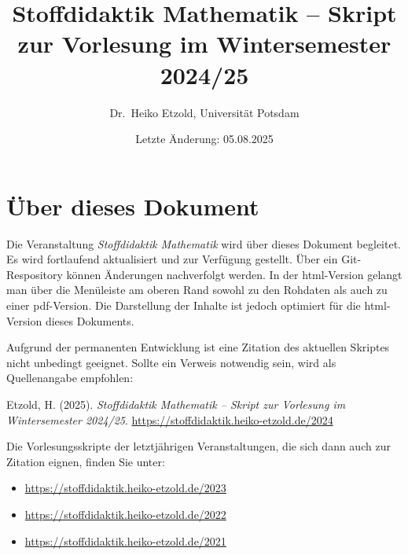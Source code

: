 \documentclass[
]{scrbook}
\title{Stoffdidaktik Mathematik -- Skript zur Vorlesung im Wintersemester 2024/25}
\author{Dr.~Heiko Etzold, Universität Potsdam}
\date{Letzte Änderung: 05.08.2025}
\makeatletter
\providecommand{\tightlist}{%
  \setlength{\itemsep}{0pt}\setlength{\parskip}{0pt}}
\renewenvironment{quote}{
  \list{}{
	\leftmargin0.2cm   %
    \rightmargin\leftmargin
      	\def\FrameCommand
    {%
        {\color{quoteColor}\vrule width 2pt}%
        \hspace{0pt}%
    }%
    \MakeFramed{\advance \hsize -\width \FrameRestore}    \color{quoteColor}
    }
  \item\relax
}
{\endlist\color{black}\endMakeFramed}
\def\renewtheorem#1{%
  \expandafter\let\csname#1\endcsname\relax
  \expandafter\let\csname c@#1\endcsname\relax
  \gdef\renewtheorem@envname{#1}
  \renewtheorem@secpar
}
\def\renewtheorem@secpar{\@ifnextchar[{\renewtheorem@numberedlike}{\renewtheorem@nonumberedlike}}
\def\renewtheorem@numberedlike[#1]#2{\newtheorem{\renewtheorem@envname}[#1]{#2}}
\def\renewtheorem@nonumberedlike#1{
\def\renewtheorem@caption{#1}
\edef\renewtheorem@nowithin{\noexpand\newtheorem{\renewtheorem@envname}{\renewtheorem@caption}}
\renewtheorem@thirdpar
}
\def\renewtheorem@thirdpar{\@ifnextchar[{\renewtheorem@within}{\renewtheorem@nowithin}}
\def\renewtheorem@within[#1]{\renewtheorem@nowithin[#1]}
\theoremstyle{definition}
\theoremstyle{definition}
\theoremstyle{definition}
\theoremstyle{definition}
\theoremstyle{remark}
\makeatother
\begin{document}
\maketitle

%

{
\hypersetup{linkcolor=}
\setcounter{tocdepth}{1}
\tableofcontents
}
\chapter*{Über dieses Dokument}\label{uxfcber-dieses-dokument}

Die Veranstaltung \emph{Stoffdidaktik Mathematik} wird über dieses Dokument begleitet. Es wird fortlaufend aktualisiert und zur Verfügung gestellt. Über ein Git-Respository können Änderungen nachverfolgt werden.
In der html-Version gelangt man über die Menüleiste am oberen Rand sowohl zu den Rohdaten als auch zu einer pdf-Version. Die Darstellung der Inhalte ist jedoch optimiert für die html-Version dieses Dokuments.

Aufgrund der permanenten Entwicklung ist eine Zitation des aktuellen Skriptes nicht unbedingt geeignet. Sollte ein Verweis notwendig sein, wird als Quellenangabe empfohlen:

\begin{quote}
Etzold, H. (2025). \emph{Stoffdidaktik Mathematik -- Skript zur Vorlesung im Wintersemester 2024/25}. \url{https://stoffdidaktik.heiko-etzold.de/2024}
\end{quote}

Die Vorlesungsskripte der letztjährigen Veranstaltungen, die sich dann auch zur Zitation eignen, finden Sie unter:

\begin{itemize}
\tightlist
\item
  \url{https://stoffdidaktik.heiko-etzold.de/2023}
\item
  \url{https://stoffdidaktik.heiko-etzold.de/2022}
\item
  \url{https://stoffdidaktik.heiko-etzold.de/2021}
\end{itemize}
\end{document}
